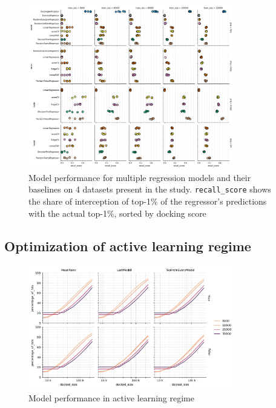 \begin{figure}[h]
\centering
\includegraphics[width=0.8\textwidth]{figures/Figure_4.png}
\caption{Model performance for multiple regression models and their baselines on 4 datasets present in the study. \texttt{recall\_score} shows the share of interception of top-1\% of the regressor's predictions with the actual top-1\%, sorted by docking score}
\label{fig:fig_4}
\end{figure}

\subsection{Optimization of active learning regime}


\begin{figure}[h]
\centering
\includegraphics[width=0.8\textwidth]{figures/Figure_3_D4.png}
\caption{Model performance in active learning regime}
\label{fig:fig_3}
\end{figure}

